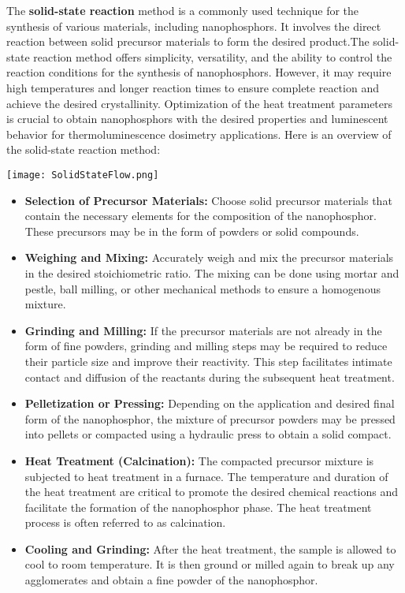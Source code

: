 \documentclass[../synthesis.tex]{subfiles}
\begin{document}
    The \textbf{solid-state reaction}\cite{b9} method is a commonly used technique for the synthesis of various materials, 
    including nanophosphors. It involves the direct reaction between solid precursor materials to form the 
    desired product.The solid-state reaction method offers simplicity, versatility, and the ability to control 
    the reaction conditions for the synthesis of nanophosphors. However, it may require high temperatures and 
    longer reaction times to ensure complete reaction and achieve the desired crystallinity. Optimization of the 
    heat treatment parameters is crucial to obtain nanophosphors with the desired properties and luminescent 
    behavior for thermoluminescence dosimetry applications. Here is an overview of the solid-state reaction method:

    \begin{Figure}
        \centering
        \texttt{[image: SolidStateFlow.png]}
        \label{fig:SolidStateFlow}
    \end{Figure}
    \begin{itemize}
        \item \textbf{Selection of Precursor Materials: } Choose solid precursor materials that contain the 
        necessary elements for the composition of the nanophosphor. These precursors may be in the form of 
        powders or solid compounds.
        \item \textbf{Weighing and Mixing: } Accurately weigh and mix the precursor materials in the desired 
        stoichiometric ratio. The mixing can be done using mortar and pestle, ball milling, or other mechanical 
        methods to ensure a homogenous mixture.
        \item \textbf{Grinding and Milling: }If the precursor materials are not already in the form of fine 
        powders, grinding and milling steps may be required to reduce their particle size and improve their 
        reactivity. This step facilitates intimate contact and diffusion of the reactants during the subsequent 
        heat treatment.
        \item \textbf{Pelletization or Pressing: }Depending on the application and desired final form of the 
        nanophosphor, the mixture of precursor powders may be pressed into pellets or compacted using a hydraulic 
        press to obtain a solid compact.
        \item \textbf{Heat Treatment (Calcination): }The compacted precursor mixture is subjected to heat 
        treatment in a furnace. The temperature and duration of the heat treatment are critical to promote the 
        desired chemical reactions and facilitate the formation of the nanophosphor phase. The heat treatment 
        process is often referred to as calcination.
        \item \textbf{Cooling and Grinding: }After the heat treatment, the sample is allowed to cool to room 
        temperature. It is then ground or milled again to break up any agglomerates and obtain a fine powder of 
        the nanophosphor.
    \end{itemize}
\end{document}
